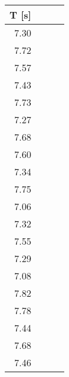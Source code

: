 \begin{tabular}{rrrr}
\hline
   T [s]\\
\hline
    7.30\\ 7.72\\ 7.57\\ 7.43\\ 7.73\\ 7.27\\ 7.68\\ 7.60\\ 7.34\\ 7.75\\
    7.06\\ 7.32\\ 7.55\\ 7.29\\ 7.08\\ 7.82\\ 7.78\\ 7.44\\ 7.68\\ 7.46\\
\hline
\end{tabular}
